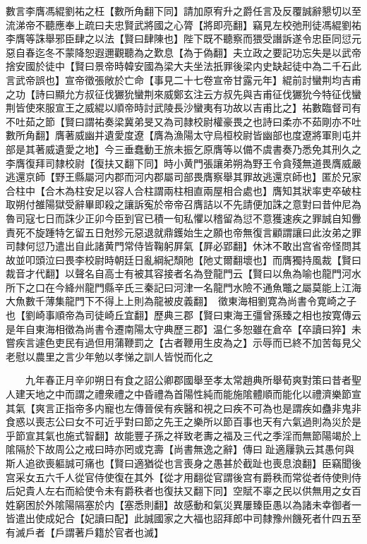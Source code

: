 數言李膺馮緄劉祐之枉【數所角翻下同】請加原宥升之爵任言及反覆誠辭懇切以至流涕帝不聽應奉上疏曰夫忠賢武將國之心膂【將即亮翻】竊見左校弛刑徒馮緄劉祐李膺等誅舉邪臣肆之以法【賢曰肆陳也】陛下既不聽察而猥受譖訴遂令忠臣同愆元惡自春迄冬不蒙降恕遐邇觀聽為之歎息【為于偽翻】夫立政之要記功忘失是以武帝捨安國於徒中【賢曰景帝時韓安國為梁大夫坐法扺罪後梁内史缺起徒中為二千石此言武帝誤也】宣帝徵張敞於亡命【事見二十七卷宣帝甘露元年】緄前討蠻荆均吉甫之功【詩曰顯允方叔征伐玁狁蠻荆來威鄭玄注云方叔先與吉甫征伐玁狁今特征伐蠻荆皆使來服宣王之威緄以順帝時討武陵長沙蠻夷有功故以吉甫比之】祐數臨督司有不吐茹之節【賢曰謂祐奏梁冀弟旻又為司隷校尉權豪畏之也詩曰柔亦不茹剛亦不吐數所角翻】膺著威幽并遺愛度遼【膺為漁陽太守烏桓校尉皆幽部也度遼將軍則屯并部是其著威遺愛之地】今三垂蠢動王旅未振乞原膺等以備不虞書奏乃悉免其刑久之李膺復拜司隸校尉【復扶又翻下同】時小黄門張讓弟朔為野王令貪殘無道畏膺威嚴逃還京師【野王縣屬河内郡而河内郡屬司部畏膺察舉其罪故逃還京師也】匿於兄家合柱中【合木為柱安足以容人合柱謂兩柱相直兩屋相合處也】膺知其狀率吏卒破柱取朔付雒陽獄受辭畢即殺之讓訴寃於帝帝召膺詰以不先請便加誅之意對曰昔仲尼為魯司寇七日而誅少正卯今臣到官已積一旬私懼以稽留為愆不意獲速疾之罪誠自知釁責死不旋踵特乞留五日尅殄元惡退就鼎鑊始生之願也帝無復言顧謂讓曰此汝弟之罪司隸何愆乃遣出自此諸黄門常侍皆鞠躬屛氣【屛必郢翻】休沐不敢出宫省帝怪問其故並叩頭泣曰畏李校尉時朝廷日亂綱紀頹阤【阤丈爾翻壞也】而膺獨持風裁【賢曰裁音才代翻】以聲名自高士有被其容接者名為登龍門云【賢曰以魚為喻也龍門河水所下之口在今絳州龍門縣辛氏三秦記曰河津一名龍門水險不通魚鼈之屬莫能上江海大魚數千薄集龍門下不得上上則為龍被皮義翻】　徵東海相劉寛為尚書令寛崎之子也【劉崎事順帝為司徒崎丘宜翻】歷典三郡【賢曰東海王彊曾孫臻之相也按寛傳云是年自東海相徵為尚書令遷南陽太守典歷三郡】温仁多恕雖在倉卒【卒讀曰猝】未嘗疾言遽色吏民有過但用蒲鞭罰之【古者鞭用生皮為之】示辱而已終不加苦每見父老慰以農里之言少年勉以孝悌之訓人皆悦而化之

　　九年春正月辛卯朔日有食之詔公卿郡國舉至孝太常趙典所舉荀爽對策曰昔者聖人建天地之中而謂之禮衆禮之中昏禮為首陽性純而能施隂體順而能化以禮濟樂節宣其氣【爽言正指帝多内寵也左傳晉侯有疾醫和視之曰疾不可為也是謂疾如蠱非鬼非食惑以喪志公曰女不可近乎對曰節之先王之樂所以節百事也天有六氣過則為災於是乎節宣其氣也施式智翻】故能豐子孫之祥致老夀之福及三代之季淫而無節陽竭於上隂隔於下故周公之戒曰時亦罔或克壽【尚書無逸之辭】傳曰趾適屨孰云其愚何與斯人追欲喪軀誠可痛也【賢曰適猶從也言喪身之愚甚於截趾也喪息浪翻】臣竊聞後宫采女五六千人從官侍使復在其外【從才用翻從官謂後宫有爵秩而常從者侍使則侍后妃貴人左右而給使令未有爵秩者也復扶又翻下同】空賦不辜之民以供無用之女百姓窮困於外隂陽隔塞於内【塞悉則翻】故感動和氣災異屢臻臣愚以為諸未幸御者一皆遣出使成妃合【妃讀曰配】此誠國家之大福也詔拜郎中司隸豫州饑死者什四五至有滅戶者【戶謂著戶籍於官者也滅】

